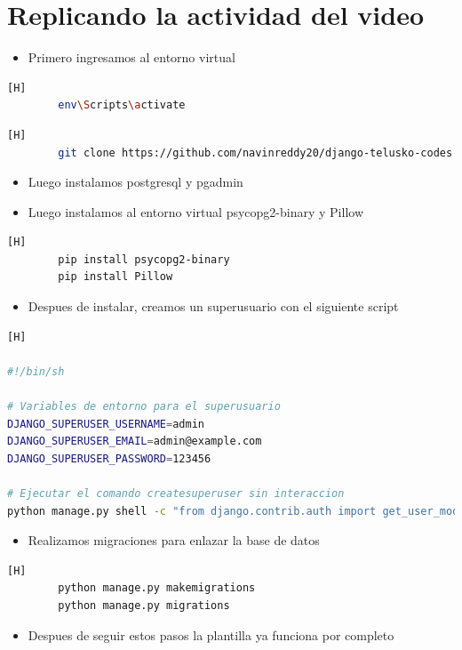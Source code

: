 \documentclass{article}
\begin{document}
\section{Replicando la actividad del video}
	\begin{itemize}
		\item Primero ingresamos al entorno virtual
	\end{itemize}
	\begin{lstlisting}[language=bash,caption={Activar el ambiente virtual}][H]
		env\Scripts\activate
	\end{lstlisting}
	\begin{lstlisting}[language=bash,caption={Clonar el repositorio}][H]
		git clone https://github.com/navinreddy20/django-telusko-codes
	\end{lstlisting}
	\begin{itemize}
		\item Luego instalamos postgresql y pgadmin 
		\item Luego instalamos al entorno virtual psycopg2-binary y Pillow
	\end{itemize}
	\begin{lstlisting}[language=bash,caption={Instalando psycopg2-binary y Pillow}][H]
		pip install psycopg2-binary
		pip install Pillow
	\end{lstlisting}
	\begin{itemize}
		\item  Despues de instalar, creamos un superusuario con el siguiente script
	\end{itemize}
\begin{lstlisting}[language=bash,caption={Script para crear un superusuario}][H]

#!/bin/sh

# Variables de entorno para el superusuario
DJANGO_SUPERUSER_USERNAME=admin
DJANGO_SUPERUSER_EMAIL=admin@example.com
DJANGO_SUPERUSER_PASSWORD=123456

# Ejecutar el comando createsuperuser sin interaccion
python manage.py shell -c "from django.contrib.auth import get_user_model; User = get_user_model(); User.objects.create_superuser('$DJANGO_SUPERUSER_USERNAME', '$DJANGO_SUPERUSER_EMAIL', '$DJANGO_SUPERUSER_PASSWORD') if not User.objects.filter(username='$DJANGO_SUPERUSER_USERNAME').exists() else print('Superusuario ya existe.')"
	\end{lstlisting}
	\begin{itemize}
		\item Realizamos migraciones para enlazar la base de datos
	\end{itemize}
	\begin{lstlisting}[language=bash,caption={Codigo para realizar migraciones}][H]
		python manage.py makemigrations
		python manage.py migrations
	\end{lstlisting}
	\begin{itemize}
		\item Despues de seguir estos pasos la plantilla ya funciona por completo
	\end{itemize}
\end{document}
